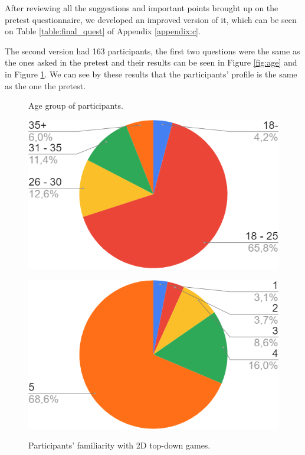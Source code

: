 After reviewing all the suggestions and important points brought up on the pretest questionnaire, we developed an improved version of it, which can be seen on Table \ref{table:final_quest} of Appendix \ref{appendix:c}.

The second version had 163 participants, the first two questions were the same as the ones asked in the pretest and their results can be seen in Figure \ref{fig:age} and in Figure \ref{fig:gamekn}. We can see by these results that the participants' profile is the same as the one the pretest.

\begin{figure}[h]
  \centering
  \begin{minipage}[b]{0.4\textwidth}
    \caption{Age group of participants.}
    \includegraphics[width=\textwidth]{images/survey/age.png}
    \label{fig:age}
  \end{minipage}
  \hfill
  \begin{minipage}[b]{0.4\textwidth}
    \caption{Participants' familiarity with 2D top-down games.}
    \includegraphics[width=\textwidth]{images/survey/played.png}
    \label{fig:gamekn}
  \end{minipage}
\end{figure}

